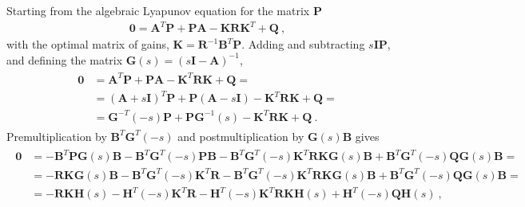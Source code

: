 \documentclass[letterpaper,10pt,english]{jupyterBook}
\begin{document}
\sphinxAtStartPar
Starting from the algebraic Lyapunov equation for the matrix \(\mathbf{P}\)
\begin{equation*}
\begin{split}\mathbf{0} = \mathbf{A}^T \mathbf{P} + \mathbf{P} \mathbf{A} - \mathbf{K} \mathbf{R} \mathbf{K}^T + \mathbf{Q} \ ,\end{split}
\end{equation*}
\sphinxAtStartPar
with the optimal matrix of gains, \(\mathbf{K} = \mathbf{R}^{-1} \mathbf{B}^T \mathbf{P}\). Adding and subtracting \(s \mathbf{I} \mathbf{P}\), and defining the matrix \(\mathbf{G}(s) = ( s \mathbf{I} - \mathbf{A} )^{-1}\),
\begin{equation*}
\begin{split}\begin{aligned}
  \mathbf{0}
  & = \mathbf{A}^T \mathbf{P} + \mathbf{P} \mathbf{A} - \mathbf{K}^T \mathbf{R} \mathbf{K} + \mathbf{Q} = \\
  & = ( \mathbf{A} + s \mathbf{I} )^T \mathbf{P} + \mathbf{P} ( \mathbf{A} - s \mathbf{I} ) - \mathbf{K}^T \mathbf{R} \mathbf{K} + \mathbf{Q} = \\
  & = \mathbf{G}^{-T}(-s) \mathbf{P} + \mathbf{P} \mathbf{G}^{-1}(s) - \mathbf{K}^T \mathbf{R} \mathbf{K} + \mathbf{Q} \ .
\end{aligned}\end{split}
\end{equation*}
\sphinxAtStartPar
Pre\sphinxhyphen{}multiplication by \(\mathbf{B}^T \mathbf{G}^T(-s)\) and post\sphinxhyphen{}multiplication by \(\mathbf{G}(s) \mathbf{B}\) gives
\begin{equation*}
\begin{split}\begin{aligned}
  \mathbf{0}
  & = - \mathbf{B}^T \mathbf{P} \mathbf{G}(s) \mathbf{B} - \mathbf{B}^T \mathbf{G}^T(-s) \mathbf{P} \mathbf{B} - \mathbf{B}^T \mathbf{G}^{T}(-s) \mathbf{K}^T \mathbf{R} \mathbf{K} \mathbf{G}(s) \mathbf{B} + \mathbf{B}^T \mathbf{G}^{T}(-s) \mathbf{Q} \mathbf{G}(s) \mathbf{B} = \\
  & = - \mathbf{R} \mathbf{K} \mathbf{G}(s) \mathbf{B} - \mathbf{B}^T \mathbf{G}^T(-s) \mathbf{K}^T \mathbf{R} - \mathbf{B}^T \mathbf{G}^{T}(-s) \mathbf{K}^T \mathbf{R} \mathbf{K} \mathbf{G}(s) \mathbf{B} + \mathbf{B}^T \mathbf{G}^{T}(-s) \mathbf{Q} \mathbf{G}(s) \mathbf{B} = \\
  & = - \mathbf{R} \mathbf{K} \mathbf{H}(s) - \mathbf{H}^T(-s) \mathbf{K}^T \mathbf{R} - \mathbf{H}^{T}(-s) \mathbf{K}^T \mathbf{R} \mathbf{K} \mathbf{H}(s) + \mathbf{H}^{T}(-s) \mathbf{Q} \mathbf{H}(s) \ ,
\end{aligned}\end{split}
\end{equation*}
\end{document}
